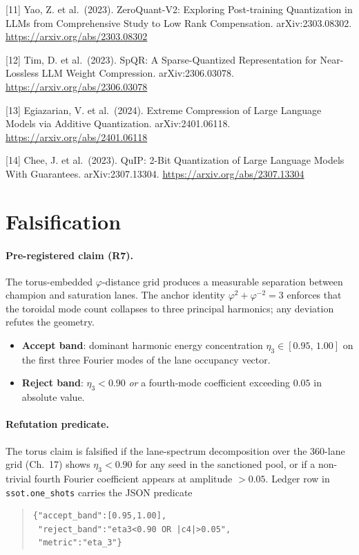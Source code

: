 [11] Yao, Z. et al.~(2023). ZeroQuant-V2:
Exploring Post-training Quantization in LLMs from
Comprehensive Study to Low Rank Compensation.
arXiv:2303.08302. \url{https://arxiv.org/abs/2303.08302}

[12] Tim, D. et al.~(2023). SpQR: A
Sparse-Quantized Representation for Near-Lossless
LLM Weight Compression. arXiv:2306.03078.
\url{https://arxiv.org/abs/2306.03078}

[13] Egiazarian, V. et al.~(2024). Extreme
Compression of Large Language Models via Additive
Quantization. arXiv:2401.06118.
\url{https://arxiv.org/abs/2401.06118}

[14] Chee, J. et al.~(2023). QuIP: 2-Bit
Quantization of Large Language Models With
Guarantees. arXiv:2307.13304.
\url{https://arxiv.org/abs/2307.13304}

\section{Falsification}
\label{fa_18:sec:falsification:ch18}

\paragraph{Pre-registered claim (R7).}
The torus-embedded $\varphi$-distance grid produces a measurable separation
between champion and saturation lanes. The anchor identity
$\varphi^2 + \varphi^{-2} = 3$ enforces that the toroidal mode count
collapses to three principal harmonics; any deviation refutes the geometry.

\begin{itemize}
    \item \textbf{Accept band}: dominant harmonic energy concentration
          $\eta_3 \in [0.95,\,1.00]$ on the first three Fourier modes of
          the lane occupancy vector.
    \item \textbf{Reject band}: $\eta_3 < 0.90$ \emph{or} a fourth-mode
          coefficient exceeding $0.05$ in absolute value.
\end{itemize}

\paragraph{Refutation predicate.}
The torus claim is falsified if the lane-spectrum decomposition over the
360-lane grid (Ch.~17) shows $\eta_3 < 0.90$ for any seed in the sanctioned
pool, or if a non-trivial fourth Fourier coefficient appears at amplitude
$> 0.05$. Ledger row in \texttt{ssot.one\_shots} carries the JSON predicate
\begin{quote}\footnotesize
\begin{verbatim}
{"accept_band":[0.95,1.00],
 "reject_band":"eta3<0.90 OR |c4|>0.05",
 "metric":"eta_3"}
\end{verbatim}
\end{quote}

